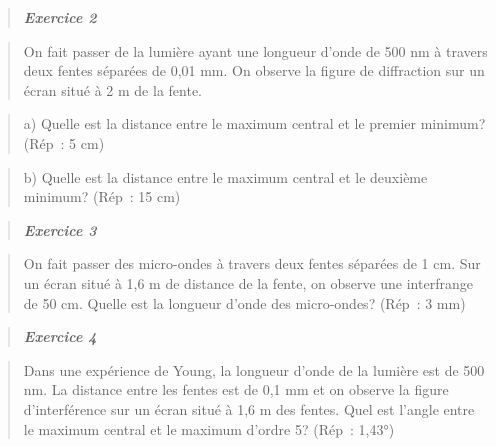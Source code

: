 \begin{quote}
\emph{\textbf{Exercice 2}}
\end{quote}

\begin{quote}
\end{quote}

\begin{quote}
On fait passer de la lumière ayant une longueur d'onde de 500 nm à
travers deux fentes séparées de 0,01 mm. On observe la figure de
diffraction sur un écran situé à 2 m de la fente.
\end{quote}

\begin{quote}
a) Quelle est la distance entre le maximum central et le premier
minimum? (Rép~: 5 cm)
\end{quote}

\begin{quote}
b) Quelle est la distance entre le maximum central et le deuxième
minimum? (Rép~: 15 cm)
\end{quote}

\begin{quote}
\end{quote}

\begin{quote}
\emph{\textbf{Exercice 3}}
\end{quote}

\begin{quote}
On fait passer des micro-ondes à travers deux fentes séparées de 1 cm.
Sur un écran situé à 1,6 m de distance de la fente, on observe une
interfrange de 50 cm. Quelle est la longueur d'onde des micro-ondes?
(Rép~: 3 mm)
\end{quote}

\begin{quote}
\end{quote}

\begin{quote}
\emph{\textbf{Exercice 4}}
\end{quote}

\begin{quote}
Dans une expérience de Young, la longueur d'onde de la lumière est de
500 nm. La distance entre les fentes est de 0,1 mm et on observe la
figure d'interférence sur un écran situé à 1,6 m des fentes. Quel est
l'angle entre le maximum central et le maximum d'ordre 5? (Rép~: 1,43°)
\end{quote}

\begin{quote}
\end{quote}

